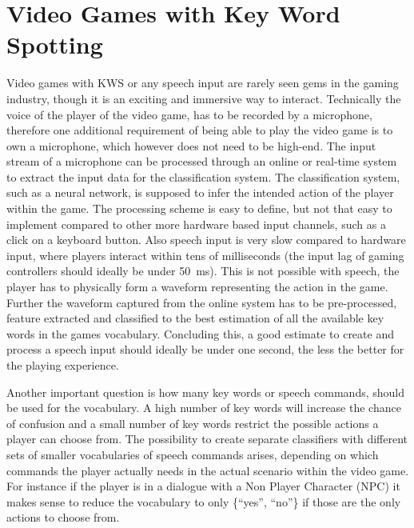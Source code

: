 
\section{Video Games with Key Word Spotting}\label{sec:intro_games}
\thesisStateRevised
Video games with KWS or any speech input are rarely seen gems in the gaming industry, though it is an exciting and immersive way to interact.
Technically the voice of the player of the video game, has to be recorded by a microphone, therefore one additional requirement of being able to play the video game is to own a microphone, which however does not need to be high-end.
The input stream of a microphone can be processed through an online or real-time system to extract the input data for the classification system.
The classification system, such as a neural network, is supposed to infer the intended action of the player within the game.
The processing scheme is easy to define, but not that easy to implement compared to other more hardware based input channels, such as a click on a keyboard button.
Also speech input is very slow compared to hardware input, where players interact within tens of milliseconds (the input lag of gaming controllers should ideally be under \SI{50}{\milli\second}).
This is not possible with speech, the player has to physically form a waveform representing the action in the game.
Further the waveform captured from the online system has to be pre-processed, feature extracted and classified to the best estimation of all the available key words in the games vocabulary.
Concluding this, a good estimate to create and process a speech input should ideally be under one second, the less the better for the playing experience.

Another important question is how many key words or speech commands, should be used for the vocabulary.
A high number of key words will increase the chance of confusion and a small number of key words restrict the possible actions a player can choose from.
The possibility to create separate classifiers with different sets of smaller vocabularies of speech commands arises, depending on which commands the player actually needs in the actual scenario within the video game. 
For instance if the player is in a dialogue with a Non Player Character (NPC) it makes sense to reduce the vocabulary to only \{\enquote{yes}, \enquote{no}\} if those are the only actions to choose from.

